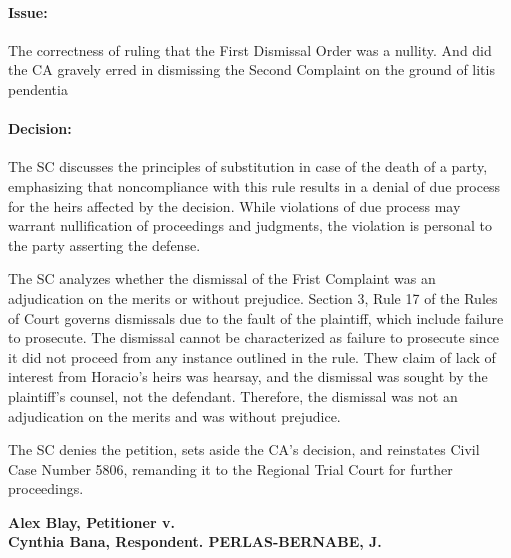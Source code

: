\documentclass[
12pt,
oneside,
onehalfspacing,
headsepline
]{DigestCollection}
\begin{document}
\paragraph{Issue:}
\label{acc8ee80-09fd-11ef-932c-63c852f65e48}


The correctness of ruling that the First Dismissal Order was a nullity. And did the CA gravely erred in dismissing the Second Complaint on the ground of litis pendentia

\paragraph{Decision:}
\label{ae9d8770-09fd-11ef-932c-63c852f65e48}


The SC discusses the principles of substitution in case of the death of a party, emphasizing that noncompliance with this rule results in a denial of due process for the heirs affected by the decision. While violations of due process may warrant nullification of proceedings and judgments, the violation is personal to the party asserting the defense.

The SC analyzes whether the dismissal of the Frist Complaint was an adjudication on the merits or without prejudice. Section 3, Rule 17 of the Rules of Court governs dismissals due to the fault of the plaintiff, which include failure to prosecute. The dismissal cannot be characterized as failure to prosecute since it did not proceed from any instance outlined in the rule. Thew claim of lack of interest from Horacio's heirs was hearsay, and the dismissal was sought by the plaintiff's counsel, not the defendant. Therefore, the dismissal was not an adjudication on the merits and was without prejudice.

The SC denies the petition, sets aside the CA's decision, and reinstates Civil Case Number 5806, remanding it to the Regional Trial Court for further proceedings.

\label{e1f965a0-0a0f-11ef-932c-63c852f65e48}


\noindent\textbf{Alex Blay, Petitioner v. \\Cynthia Bana, Respondent. PERLAS-BERNABE, J.}\vspace{0.4cm}
\end{document}
